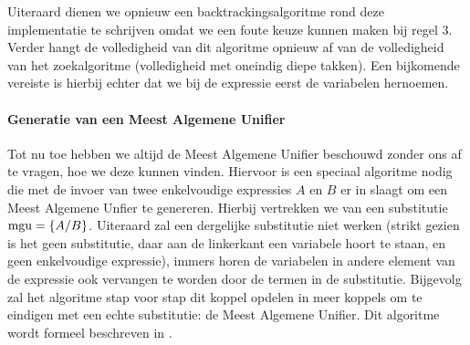 Uiteraard dienen we opnieuw een backtrackingsalgoritme rond deze implementatie te schrijven omdat we een foute keuze kunnen maken bij regel 3. Verder hangt de volledigheid van dit algoritme opnieuw af van de volledigheid van het zoekalgoritme (volledigheid met oneindig diepe takken). Een bijkomende vereiste is hierbij echter dat we bij de expressie eerst de variabelen hernoemen.
\paragraph{Generatie van een Meest Algemene Unifier}
Tot nu toe hebben we altijd de Meest Algemene Unifier beschouwd zonder ons af te vragen, hoe we deze kunnen vinden. Hiervoor is een speciaal algoritme nodig die met de invoer van twee enkelvoudige expressies $A$ en $B$ er in slaagt om een Meest Algemene Unfier te genereren. Hierbij vertrekken we van een substitutie $\mbox{mgu}=\left\{A/B\right\}$. Uiteraard zal een dergelijke substitutie niet werken (strikt gezien is het geen substitutie, daar aan de linkerkant een variabele hoort te staan, en geen enkelvoudige expressie), immers horen de variabelen in andere element van de expressie ook vervangen te worden door de termen in de substitutie. Bijgevolg zal het algoritme stap voor stap dit koppel opdelen in meer koppels om te eindigen met een echte substitutie: de Meest Algemene Unifier. Dit algoritme wordt formeel beschreven in .
